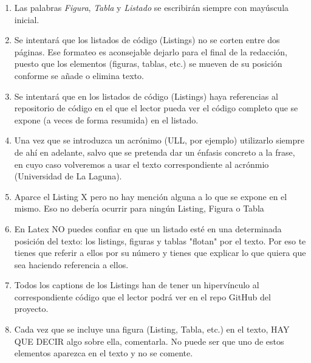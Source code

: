 \begin{enumerate}
The labor cost is calculated at \textbf{20.00€/hour}, based on the average salary of a junior deep learning developer in Spain (35,000€-37,000€ annually), sourced from PayScale\footnote{https://www.payscale.com/research/ES/Job=Machine\_Learning\_Engineer/Salary}, Glassdoor España\footnote{https://www.glassdoor.es/Sueldos/machine-learning-engineer-sueldo-SRCH\_KO0,25.htm}, and specialized tech salary reports from Manfred\footnote{https://www.getmanfred.com/en/blog/guia-salarial-2024-salarios-en-tecnologia-espana-manfred}.

\item Las palabras \textit{Figura}, \textit{Tabla} y \textit{Listado} se escribirán siempre con mayúscula inicial.

\item Se intentará que los listados de código (Listings) no se corten entre dos páginas. 
Ese formateo es aconsejable dejarlo para el final de la redacción, puesto que los elementos (figuras, tablas, etc.) se mueven de su posición conforme se añade o elimina texto.

\item Se intentará que en los listados de código (Listings) haya referencias al repositorio de código en el que el lector pueda ver el código completo que se expone (a veces de forma resumida) en el listado.

\item Una vez que se introduzca un acrónimo (ULL, por ejemplo) utilizarlo siempre de ahí en adelante, salvo que se pretenda dar un énfasis concreto a la frase, en cuyo caso volveremos a usar el texto correspondiente al acrónmio (Universidad de La Laguna).

\item Aparce el Listing X pero no hay mención alguna a lo que se expone en el mismo. Eso no debería ocurrir para ningún Listing, Figura o Tabla

\item En Latex NO puedes confiar en que un listado esté en una determinada posición del texto: los listings, figuras y tablas "flotan" por el texto. Por eso te tienes que referir a ellos por su número y tienes que explicar lo que quiera que sea haciendo referencia a ellos.

\item Todos los captions de los Listings han de tener un hipervínculo al correspondiente código que el lector podrá ver en el repo GitHub del proyecto. 

\item Cada vez que se incluye una figura (Listing, Tabla, etc.) en el texto, HAY QUE DECIR algo sobre ella, comentarla.
No puede ser que uno de estos elementos aparezca en el texto y no se comente.


\end{enumerate}
